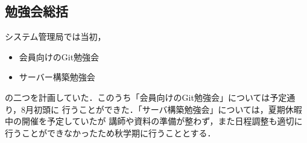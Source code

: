 \subsection*{勉強会総括}


システム管理局では当初，

\begin{itemize}
    \item 会員向けのGit勉強会
    \item サーバー構築勉強会
\end{itemize}

の二つを計画していた．このうち「会員向けのGit勉強会」については予定通り，8月初頭に
行うことができた．「サーバ構築勉強会」については，夏期休暇中の開催を予定していたが
講師や資料の準備が整わず，また日程調整も適切に行うことができなかったため秋学期に行うこととする．
